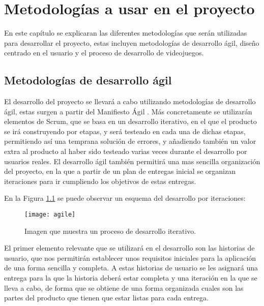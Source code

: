 \chapter{Metodologías a usar en el proyecto}
\label{ch:metodologias}
En este capítulo se explicaran las diferentes metodologías que serán utilizadas para desarrollar el proyecto, estas incluyen metodologías de desarrollo ágil, diseño centrado en el usuario y el proceso de desarrollo de videojuegos.

\section{Metodologías de desarrollo ágil}
El desarrollo del proyecto se llevará a cabo utilizando metodologías de desarrollo ágil, estas surgen a partir del Manifiesto Ágil \cite{beck}. Más concretamente se utilizarán elementos de Scrum, que se basa en un desarrollo iterativo, en el que el producto se irá construyendo por etapas, y será testeado en cada una de dichas etapas, permitiendo así una temprana solución de errores, y añadiendo también un valor extra al producto al haber sido testeado varias veces durante el desarrollo por usuarios reales. El desarrollo ágil también permitirá una mas sencilla organización del proyecto, en la que a partir de un plan de entregas inicial se organizan iteraciones para ir cumpliendo los objetivos de estas entregas.\\

\newpage

En la Figura \ref{figura-agile} se puede observar un esquema del desarrollo por iteraciones:

\begin{figure}[h]
  \centering
  \texttt{[image: agile]}
  \caption{Imagen que muestra un proceso de desarrollo iterativo.\protect\footnotemark}
  \label{figura-agile}
\end{figure}


El primer elemento relevante que se utilizará en el desarrollo son las historias de usuario, que nos permitirán establecer unos requisitos iniciales para la aplicación de una forma sencilla y completa. A estas historias de usuario se les asignará una entrega para la que la historia deberá estar completa y una iteración en la que se lleva a cabo, de forma que se obtiene de una forma organizada cuales son las partes del producto que tienen que estar listas para cada entrega.\\

